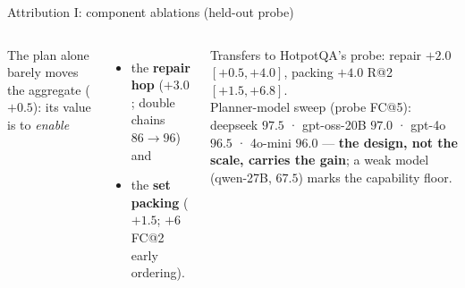\documentclass[aspectratio=169,10pt]{beamer}
\newcommand{\good}[1]{\textcolor{verde}{\textbf{#1}}}
\begin{document}
\begin{frame}{Attribution I: component ablations (held-out probe)}
\begin{columns}[T]
\centering
{}
\footnotesize
The plan alone barely moves the aggregate ($+0.5$): its value is to
\emph{enable}
\begin{itemize}\footnotesize
\item the \textbf{repair hop} ($+3.0$; double chains $86\to96$) and
\item the \textbf{set packing} ($+1.5$; $+6$ FC@2 early ordering).
\end{itemize}
Transfers to HotpotQA's probe: repair $+2.0$ $[+0.5,+4.0]$, packing
$+4.0$ R@2 $[+1.5,+6.8]$.\\[1mm]
Planner-model sweep (probe FC@5): deepseek $97.5$ · gpt-oss-20B $97.0$ ·
gpt-4o $96.5$ · 4o-mini $96.0$ --- \good{the design, not the scale, carries
the gain}; a weak model (qwen-27B, $67.5$) marks the capability floor.
\end{columns}
\end{frame}
\end{document}

